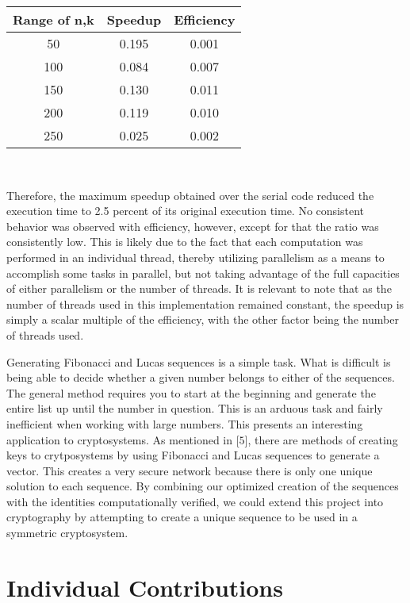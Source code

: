 \documentclass[11pt]{article}
\begin{document}
\begin{center}
\begin{tabular}{ccc}
\hline
 Range of n,k & Speedup  & Efficiency \\ \hline
50 & 0.195 & 0.001\\
100 & 0.084 & 0.007 \\
150 & 0.130 & 0.011 \\
200 & 0.119 & 0.010 \\
250 & 0.025 & 0.002 \\ 
 \hline \hline
\end{tabular} \\
\end{center}

Therefore, the maximum speedup obtained over the serial code reduced the execution time to 2.5 percent of its original execution time. No consistent behavior was observed with efficiency, however, except for that the ratio was consistently low. This is likely due to the fact that each computation was performed in an individual thread, thereby utilizing parallelism as a means to accomplish some tasks in parallel, but not taking advantage of the full capacities of either parallelism or the number of threads. It is relevant to note that as the number of threads used in this implementation remained constant, the speedup is simply a scalar multiple of the efficiency, with the other factor being the number of threads used.


Generating Fibonacci and Lucas sequences is a simple task.  What is difficult is being able to decide whether a given number belongs to either of the sequences.  The general method requires you to start at the beginning and generate the entire list up until the number in question.  This is an arduous task and fairly inefficient when working with large numbers.  This presents an interesting application to cryptosystems.  As mentioned in [$5$], there are methods of creating keys to crytposystems by using Fibonacci and Lucas sequences to generate a vector.  This creates a very secure network because there is only one unique solution to each sequence.  By combining our optimized creation of the sequences with the identities computationally verified, we could extend this project into cryptography by attempting to create a unique sequence to be used in a symmetric cryptosystem.       
\section{Individual Contributions}
\end{document}
